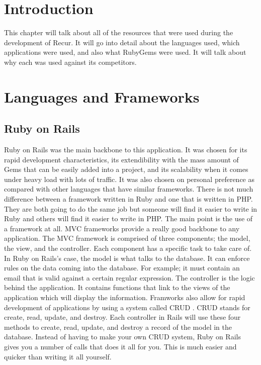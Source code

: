 \section{Introduction}
This chapter will talk about all of the resources that were used during the development of Recur. It will go into detail about the languages used, which applications were used, and also what RubyGems were used. It will talk about why each was used against its competitors.

\section{Languages and Frameworks}
\subsection{Ruby on Rails}
Ruby on Rails was the main backbone to this application. It was chosen for its rapid development characteristics, its extendibility with the mass amount of Gems that can be easily added into a project, and its scalability when it comes under heavy load with lots of traffic. It was also chosen on personal preference as compared with other languages that have similar frameworks. There is not much difference between a framework written in Ruby and one that is written in PHP. They are both going to do the same job but someone will find it easier to write in Ruby and others will find it easier to write in PHP. The main point is the use of a framework at all. MVC frameworks provide a really good backbone to any application. The MVC framework is comprised of three components; the model, the view, and the controller. Each component has a specific task to take care of. In Ruby on Rails's case, the model is what talks to the database. It can enforce rules on the data coming into the database. For example; it must contain an email that is valid against a certain regular expression. The controller is the logic behind the application. It contains functions that link to the views of the application which will display the information. Framworks also allow for rapid development of applications by using a system called CRUD . CRUD stands for create, read, update, and destroy. Each controller in Rails will use these four methods to create, read, update, and destroy a record of the model in the database. Instead of having to make your own CRUD system, Ruby on Rails gives you a number of calls that does it all for you. This is much easier and quicker than writing it all yourself.\\

